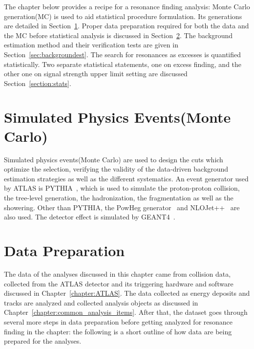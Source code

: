 The chapter below provides a recipe for a resonance finding analysis: Monte Carlo generation(MC) is used to aid statistical procedure formulation. Its generations are detailed in Section~\ref{sec:MC}. Proper data preparation required for both the data and the MC before statistical analysis is discussed in Section~\ref{sec:dataprep}. The background estimation method and their verification tests are given in Section~\ref{sec:backgroundest}. The search for resonances as excesses is quantified statistically. Two separate statistical statements, one on excess finding, and the other one on signal strength upper limit setting are discussed Section~\ref{section:stats}. 

\section{Simulated Physics Events(Monte Carlo)}
\label{sec:MC}
Simulated physics events(Monte Carlo) are used to design the cuts which optimize the selection, verifying the validity of the data-driven background estimation strategies as well as the different systematics.
An event generator used by ATLAS is PYTHIA~\cite{PYTHIA}, which is used to simulate the proton-proton collision, the tree-level generation, the hadronization, the fragmentation as well as the showering. 
Other than PYTHIA, the PowHeg generator~\cite{oleari2010powheg} and NLOJet++~\cite{nagynlojet++} are also used.
The detector effect is simulated by GEANT4~\cite{Agostinelli:602040}.



\section{Data Preparation}
\label{sec:dataprep}
The data of the analyses discussed in this chapter came from collision data, collected from the ATLAS detector and its triggering hardware and software discussed in Chapter~\ref{chapter:ATLAS}. The data collected as energy deposits and tracks are analyzed and collected analysis objects as discussed in Chapter~\ref{chapter:common_analysis_items}. After that, the dataset goes through several more steps in data preparation before getting analyzed for resonance finding in the chapter: the following is a short outline of how data are being prepared for the analyses.

